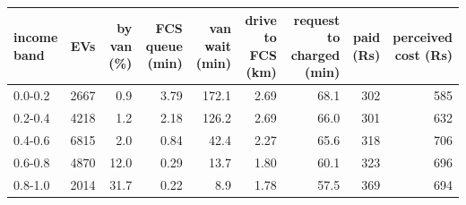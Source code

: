 \begin{tabular}{@{}lrrrrrrrr@{}}
\toprule
\shortstack[l]{income\\band} & EVs & \shortstack[r]{by van\\(\%)} & \shortstack[r]{FCS queue\\(min)} & \shortstack[r]{van wait\\(min)} & \shortstack[r]{drive to\\FCS (km)} & \shortstack[r]{request to\\charged (min)} & \shortstack[r]{paid\\(Rs)} & \shortstack[r]{perceived\\cost (Rs)} \\
\midrule
0.0-0.2 & 2667 & 0.9 & 3.79 & 172.1 & 2.69 & 68.1 & 302 & 585 \\
0.2-0.4 & 4218 & 1.2 & 2.18 & 126.2 & 2.69 & 66.0 & 301 & 632 \\
0.4-0.6 & 6815 & 2.0 & 0.84 & 42.4 & 2.27 & 65.6 & 318 & 706 \\
0.6-0.8 & 4870 & 12.0 & 0.29 & 13.7 & 1.80 & 60.1 & 323 & 696 \\
0.8-1.0 & 2014 & 31.7 & 0.22 & 8.9 & 1.78 & 57.5 & 369 & 694 \\
\bottomrule
\end{tabular}
